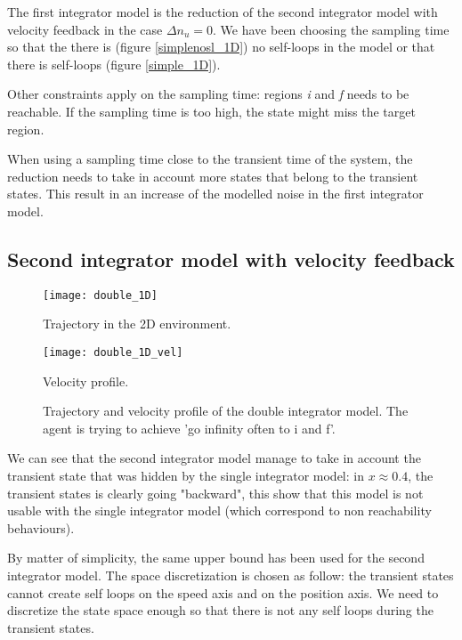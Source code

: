 The first integrator model is the reduction of the second integrator model with velocity feedback in the case $\Delta n_u = 0$.
We have been choosing the sampling time so that the there is (figure \ref{simplenosl_1D}) no self-loops in the model or that there is self-loops (figure \ref{simple_1D}).

\newcommand{\reg}[1]{\textit{#1}}
Other constraints apply on the sampling time: regions \reg{i} and \reg{f} needs to be reachable. If the sampling time is too high, the state might miss the target region.

When using a sampling time close to the transient time of the system, the reduction needs to take in account more states that belong to the transient states. This result in an increase of the modelled noise in the first integrator model.

\subsection{Second integrator model with velocity feedback}

\begin{figure}[!ht]
	\begin{minipage}[b]{0.5\textwidth}
  		\centering
  		\texttt{[image: double\_1D]}
	  	\caption{Trajectory in the 2D environment.}
	  	\label{double_1D}
  \end{minipage}
	\begin{minipage}[b]{0.5\textwidth}
  		\centering
  		\texttt{[image: double\_1D\_vel]}
	  	\caption{Velocity profile.}
	  	\label{double_1D_vel}
  \end{minipage}
  \caption{Trajectory and velocity profile of the double integrator model. The agent is trying to achieve 'go infinity often to i and f'.}
\end{figure}

We can see that the second integrator model manage to take in account the transient state that was hidden by the single integrator model: in $x\approx0.4$, the transient states is clearly going "backward", this show that this model is not usable with the single integrator model (which correspond to non reachability behaviours).

By matter of simplicity, the same upper bound has been used for the second integrator model.
The space discretization is chosen as follow:
the transient states cannot create self loops on the speed axis and on the position axis.
We need to discretize the state space enough so that there is not any self loops during the transient states. 

